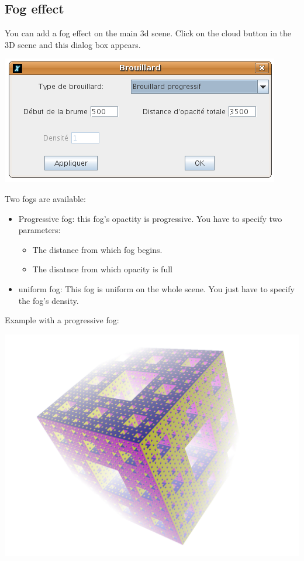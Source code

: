 \subsection{Fog effect}
You can add a fog effect on the main 3d scene. Click on the cloud button in the 3D scene and this dialog box appears.
\begin{center}
 \includegraphics*[scale=0.6]{pics/CaptureFog.png}
\end{center}
Two fogs are available:
\begin{itemize}
 \item Progressive fog: this fog's opactity is progressive. You have to specify two parameters:
	\begin{itemize}
 	\item The distance from which fog begins.
 	\item The disatnce from which opacity is full\\
	\end{itemize}
\item uniform fog: This fog is uniform on the whole scene. You just have to specify the fog's density.
\end{itemize}
\vspace*{0.2cm}
Example with a progressive fog:
\begin{center}
 \includegraphics*[scale=0.4]{pics/example-fog.png}
\end{center}

